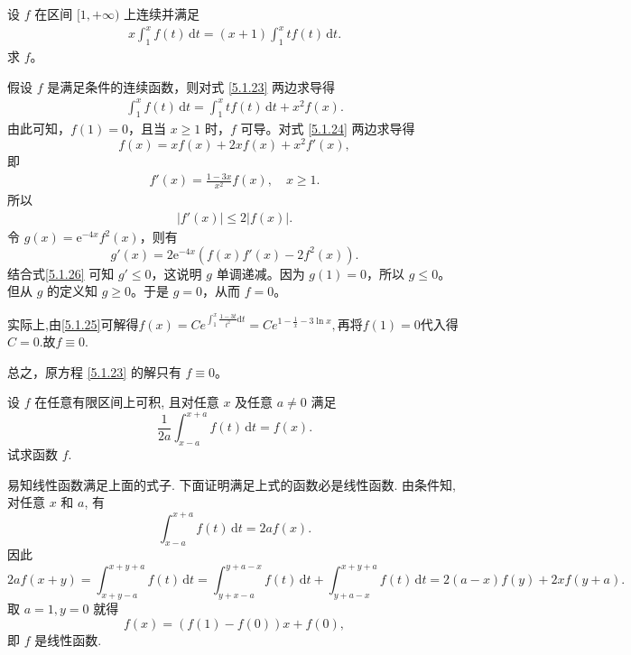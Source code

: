 \documentclass[../../main.tex]{subfiles}
\begin{document}
\begin{example}
设 \( f \) 在区间 \([1,+\infty)\) 上连续并满足
\begin{align}
x \int_{1}^{x} f(t) \, \mathrm{d}t = (x + 1) \int_{1}^{x} t f(t) \, \mathrm{d}t. \label{5.1.23}
\end{align}
求 \( f \)。
\end{example}
\begin{solution}
假设 \( f \) 是满足条件的连续函数，则对式 \eqref{5.1.23}  两边求导得
\begin{align}
\int_{1}^{x} f(t) \, \mathrm{d}t = \int_{1}^{x} t f(t) \, \mathrm{d}t + x^2 f(x). \label{5.1.24}
\end{align}
由此可知，\( f(1) = 0 \)，且当 \( x \geq 1 \) 时，\( f \) 可导。对式 \eqref{5.1.24} 两边求导得
\[
f(x) = x f(x) + 2x f(x) + x^2 f'(x),
\]
即
\begin{align}
f'(x) = \frac{1 - 3x}{x^2} f(x), \quad x \geq 1. \label{5.1.25}
\end{align}
所以
\begin{align}
|f'(x)| \leq 2 |f(x)|. \label{5.1.26}
\end{align}
令 \( g(x) = \mathrm{e}^{-4x} f^2(x) \)，则有
\[
g'(x) = 2 \mathrm{e}^{-4x} \left( f(x) f'(x) - 2 f^2(x) \right).
\]
结合式\eqref{5.1.26} 可知 \( g' \leq 0 \)，这说明 \( g \) 单调递减。因为 \( g(1) = 0 \)，所以 \( g \leq 0 \)。但从 \( g \) 的定义知 \( g \geq 0 \)。于是 \( g = 0 \)，从而 \( f = 0 \)。

实际上,由\eqref{5.1.25}可解得$f\left( x \right) =Ce^{\int_1^x{\frac{1-3t}{t^2}\mathrm{d}t}}=Ce^{1-\frac{1}{x}-3\ln x},$再将$f(1)=0$代入得$C=0.$故$f\equiv 0.$

总之，原方程 \eqref{5.1.23} 的解只有 \( f \equiv 0 \)。
\end{solution}

\begin{example}
设 \( f \) 在任意有限区间上可积, 且对任意 \( x \) 及任意 \( a \neq 0 \) 满足
\[
\frac{1}{2a} \int_{x - a}^{x + a} f(t) \, \mathrm{d}t = f(x).
\]
试求函数 \( f \).
\end{example}
\begin{solution}
易知线性函数满足上面的式子. 下面证明满足上式的函数必是线性函数. 由条件知, 对任意 \( x \) 和 \( a \), 有
\[
\int_{x - a}^{x + a} f(t) \, \mathrm{d}t = 2a f(x).
\]
因此
\[
2a f(x + y) = \int_{x + y - a}^{x + y + a} f(t) \, \mathrm{d}t = \int_{y + x - a}^{y + a - x} f(t) \, \mathrm{d}t + \int_{y + a - x}^{x + y + a} f(t) \, \mathrm{d}t
= 2(a - x) f(y) + 2x f(y + a).
\]
取 \( a = 1, y = 0 \) 就得
\[
f(x) = (f(1) - f(0))x + f(0),
\]
即 \( f \) 是线性函数.
\end{solution}
\end{document}
